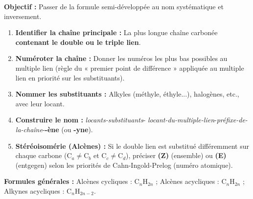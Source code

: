 \documentclass[11pt]{article}
\begin{document}
\begin{methode}
\textbf{Objectif :} Passer de la formule semi-développée au nom systématique et inversement.

\begin{enumerate}
    \item \textbf{Identifier la chaîne principale :} La plus longue chaîne carbonée \textbf{contenant le double ou le triple lien}. 
    \item \textbf{Numéroter la chaîne :} Donner les numéros les plus bas possibles au multiple lien (règle du « premier point de différence » appliquée au multiple lien en priorité sur les substituants). 
    \item \textbf{Nommer les substituants :} Alkyles (méthyle, éthyle...), halogènes, etc., avec leur locant.
    \item \textbf{Construire le nom :} \textit{locants-substituants}- \textit{locant-du-multiple-lien}-\textit{préfixe-de-la-chaîne}-\textbf{-ène} (ou \textbf{-yne}). 
    \item \textbf{Stéréoisomérie (Alcènes) :} Si le double lien est substitué différemment sur chaque carbone (C$_{a}$$\neq$C$_{b}$ et C$_{c}$$\neq$C$_{d}$), préciser \textbf{(Z)} (ensemble) ou \textbf{(E)} (entgegen) selon les priorités de Cahn-Ingold-Prelog (numéro atomique).
\end{enumerate}
\textbf{Formules générales :} Alcènes cycliques : C$_n$H$_{2n}$ ; Alcènes acycliques : C$_n$H$_{2n}$ ; Alkynes acycliques : C$_n$H$_{2n-2}$.
\end{methode}
\end{document}
